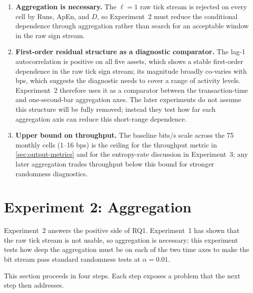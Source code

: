 \documentclass[11pt,titlepage,openany,oneside]{book}  %
\begin{document}
\begin{enumerate}
\item \textbf{Aggregation is necessary.} The $\ell = 1$ raw tick stream is rejected on every cell by Runs, ApEn, and $D$, so Experiment~2 must reduce the conditional dependence through aggregation rather than search for an acceptable window in the raw sign stream.
\item \textbf{First-order residual structure as a diagnostic comparator.} The lag-1 autocorrelation is positive on all five assets, which shows a stable first-order dependence in the raw tick sign stream; its magnitude broadly co-varies with bps, which suggests the diagnostic needs to cover a range of activity levels. Experiment~2 therefore uses it as a comparator between the transaction-time and one-second-bar aggregation axes. The later experiments do not assume this structure will be fully removed; instead they test how far each aggregation axis can reduce this short-range dependence.
\item \textbf{Upper bound on throughput.} The baseline bits/s scale across the 75 monthly cells (1--16 bps) is the ceiling for the throughput metric in \cref{sec:output-metrics} and for the entropy-rate discussion in Experiment~3; any later aggregation trades throughput below this bound for stronger randomness diagnostics.
\end{enumerate}

\section{Experiment 2: Aggregation}
\label{sec:exp2}

Experiment~2 answers the positive side of RQ1. Experiment~1 has shown that the raw tick stream is not usable, so aggregation is necessary; this experiment tests how deep the aggregation must be on each of the two time axes to make the bit stream pass standard randomness tests at $\alpha = 0.01$.

This section proceeds in four steps. Each step exposes a problem that the next step then addresses.
\end{document}

